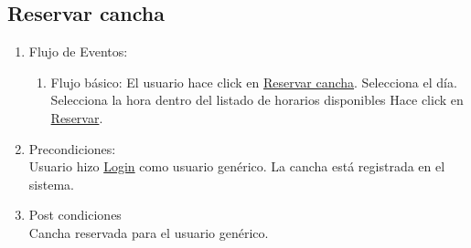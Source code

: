 \documentclass[a4paper,11pt]{article}
\begin{document}
\subsection{Reservar cancha}
\begin{enumerate}


    \begin{enumerate}
    \item Descripción breve: \\
        Este caso de uso describe la reserva de una cancha determinada.
    \item Actores \\
        Usuario genérico.
    \item Disparadores: \\
        El usuario hace click en \underline{Reservar cancha}
        dentro del menu de la cancha.
    \end{enumerate}

    \item Flujo de Eventos: 

    \begin{enumerate}

        \item Flujo básico:
            El usuario hace click en \underline{Reservar cancha}.
            Selecciona el día.
            Selecciona la hora dentro del listado de horarios disponibles
            Hace click en \underline{Reservar}.
    \end{enumerate}

    \item Precondiciones: \\
        Usuario hizo \underline{Login} como usuario genérico.
        La cancha está registrada en el sistema.

    \item Post condiciones \\
        Cancha reservada para el usuario genérico.

\end{enumerate}

\end{document}
